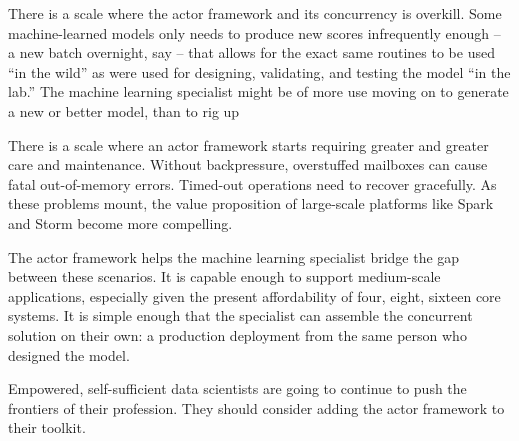 \documentclass{article}
\begin{document}
There is a scale where the actor framework and its concurrency is overkill.
Some machine-learned models only needs to produce new scores 
infrequently enough -- a new batch overnight, say -- that allows for the exact
same routines to be used ``in the wild'' as were used for designing, validating,
and testing the model ``in the lab.'' The machine learning specialist might be
of more use moving on to generate a new or better model, than to rig up

There is a scale where an actor framework starts requiring greater and greater
care and maintenance. Without backpressure, overstuffed mailboxes can cause 
fatal out-of-memory errors. Timed-out operations need to recover gracefully.
As these problems mount, the value proposition of large-scale platforms like
Spark and Storm become more compelling.

The actor framework helps the machine learning specialist bridge the gap 
between these scenarios. It is capable enough to support medium-scale
applications, especially given the present affordability of four, eight, sixteen
core systems. It is simple enough that the specialist can assemble the
concurrent solution on their own: a production deployment from the same
person who designed the model.

Empowered, self-sufficient data scientists are going to continue to push the 
frontiers of their profession. They should consider adding the actor 
framework to their toolkit.



\end{document}

